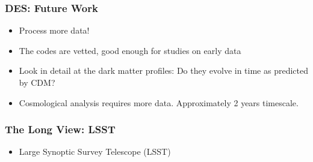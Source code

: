 \documentclass{beamer}
\begin{document}
\frame
{
    \frametitle{DES: Future Work}

    \begin{itemize}

        \item Process more data!

        \item The codes are vetted, good enough for studies on early data

        \item Look in detail at the dark matter profiles: Do they evolve in
            time as predicted by CDM?

        \item Cosmological analysis requires more data.  Approximately 2 years
            timescale.

    \end{itemize}

}


\frame
{
    \frametitle{The Long View: LSST}

 
    \begin{itemize}

        \item Large Synoptic Survey Telescope (LSST)

    \end{itemize}

}
\end{document}
